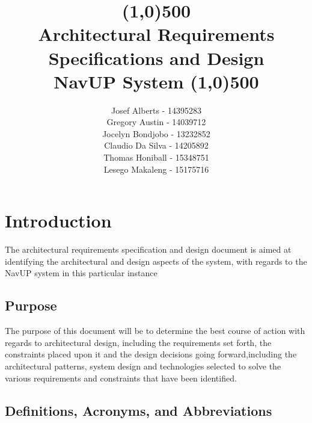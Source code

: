 \documentclass{article}
\begin{document}
	
	\title{
		\line(1,0){500}\\
		[6mm]
		\bfseries Architectural Requirements Specifications and Design 
		\\
		[6mm] 
		NavUP System
		\line(1,0){500}\\
		[15mm]}
	
	\author{
		Josef Alberts - 14395283\\ 
		Gregory Austin - 14039712\\ 
		Jocelyn Bondjobo - 13232852\\ 
		Claudio Da Silva - 14205892\\ 
		Thomas Honiball - 15348751\\
		Lesego Makaleng - 15175716}
	
	\maketitle{}
	\pagebreak
	\tableofcontents
	\pagebreak

		
	\section{Introduction}
	
	The architectural requirements specification and design document is aimed at identifying the architectural and design aspects of the system, with regards to the NavUP system in this particular instance
	
		\subsection{Purpose}
		
		The purpose of this document will be to determine the best course of action with regards to architectural design, including the requirements set forth, the constraints placed upon it and the design decisions going forward,including the architectural patterns, system design and technologies selected to solve the various requirements and constraints that have been identified.
	
		\subsection{Definitions, Acronyms, and Abbreviations}
			
\end{document}
